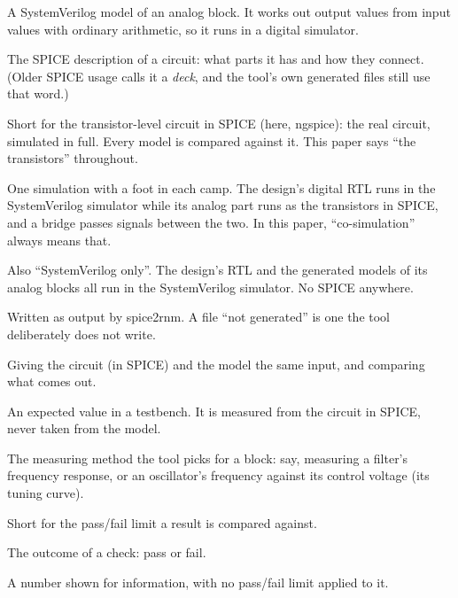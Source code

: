 \documentclass[11pt,a4paper]{article}
\begin{document}
\begin{description}[leftmargin=1.5em,itemsep=0.15em,font=\normalfont\bfseries]
  \item[Real-number model (RNM)] A SystemVerilog model of an analog
        block. It works out output values from input values with
        ordinary arithmetic, so it runs in a digital simulator.
  \item[Netlist] The SPICE description of a circuit: what parts it has
        and how they connect. (Older SPICE usage calls it a
        \emph{deck}, and the tool's own generated files still use that
        word.)
  \item[The transistors] Short for the transistor-level circuit in
        SPICE (here, ngspice): the real circuit, simulated in full.
        Every model is compared against it. This paper says ``the
        transistors'' throughout.
  \item[SV--SPICE co-simulation] One simulation with a foot in each
        camp. The design's digital RTL runs in the SystemVerilog
        simulator while its analog part runs as the transistors in
        SPICE, and a bridge passes signals between the two. In this
        paper, ``co-simulation'' always means that.
  \item[SV-only system simulation] Also ``SystemVerilog only''. The
        design's RTL and the generated models of its analog blocks all
        run in the SystemVerilog simulator. No SPICE anywhere.
  \item[Generated] Written as output by spice2rnm. A file ``not
        generated'' is one the tool deliberately does not write.
  \item[Equivalence check] Giving the circuit (in SPICE) and the model
        the same input, and comparing what comes out.
  \item[Golden value] An expected value in a testbench. It is measured
        from the circuit in SPICE, never taken from the model.
  \item[Route] The measuring method the tool picks for a block: say,
        measuring a filter's frequency response, or an oscillator's
        frequency against its control voltage (its tuning curve).
  \item[Bar] Short for the pass/fail limit a result is compared
        against.
  \item[Verdict] The outcome of a check: pass or fail.
  \item[Reported for information] A number shown for information, with
        no pass/fail limit applied to it.

\end{description}
\end{document}
